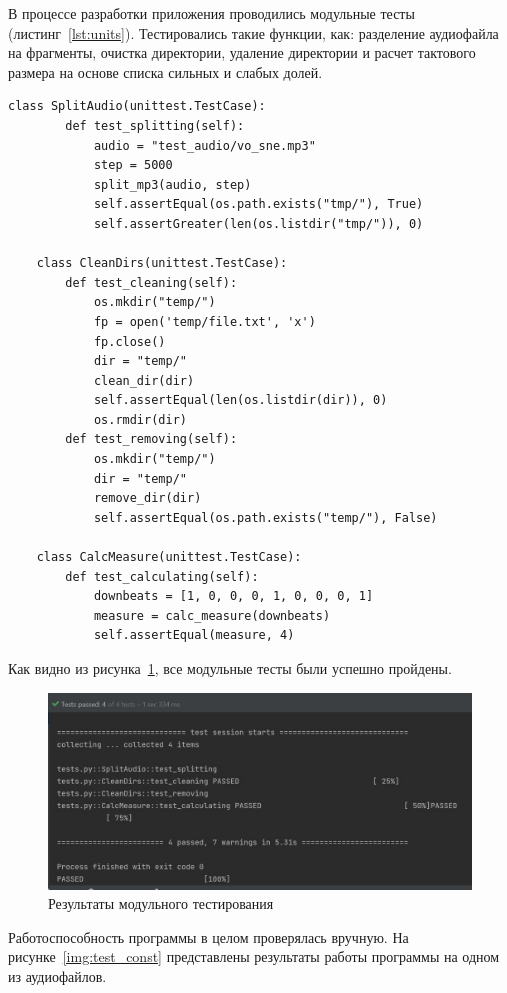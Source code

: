 В процессе разработки приложения проводились модульные тесты (листинг~\ref{lst:units}). Тестировались такие функции, как: разделение аудиофайла на фрагменты, очистка директории, удаление директории и расчет тактового размера на основе списка сильных и слабых долей.

\begin{lstlisting}[label={lst:units}, caption={модульные тесты}]
	class SplitAudio(unittest.TestCase):
		def test_splitting(self):
			audio = "test_audio/vo_sne.mp3"
			step = 5000
			split_mp3(audio, step)
			self.assertEqual(os.path.exists("tmp/"), True)
			self.assertGreater(len(os.listdir("tmp/")), 0)
	
	class CleanDirs(unittest.TestCase):
		def test_cleaning(self):
			os.mkdir("temp/")
			fp = open('temp/file.txt', 'x')
			fp.close()
			dir = "temp/"
			clean_dir(dir)
			self.assertEqual(len(os.listdir(dir)), 0)
			os.rmdir(dir)
		def test_removing(self):
			os.mkdir("temp/")
			dir = "temp/"
			remove_dir(dir)
			self.assertEqual(os.path.exists("temp/"), False)
	
	class CalcMeasure(unittest.TestCase):
		def test_calculating(self):
			downbeats = [1, 0, 0, 0, 1, 0, 0, 0, 1]
			measure = calc_measure(downbeats)
			self.assertEqual(measure, 4)
\end{lstlisting}

Как видно из рисунка~\ref{img:units}, все модульные тесты были успешно пройдены.

\begin{figure}[h]
	\centering
	\includegraphics[scale=0.8]{inc/img/units.jpg}
	\caption{Результаты модульного тестирования}
	\label{img:units}
\end{figure}

\newpage

Работоспособность программы в целом проверялась вручную. На рисунке~\ref{img:test_const} представлены результаты работы программы на одном из аудиофайлов.

